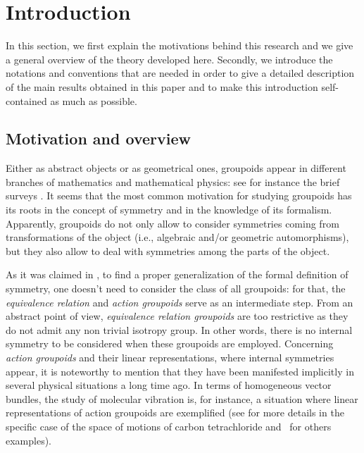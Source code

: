 \documentclass[pdftex]{sigma}
\numberwithin{equation}{section}
\begin{document}

\newcommand{\rJoin}{\rtimes}
\newcommand{\lJoin}{\ltimes}

\vspace{-2mm}

\section{Introduction}

In this section, we first explain the motivations behind this research and we give a general overview of the theory developed here. Secondly, we introduce the notations and conventions that are needed in order to give a detailed description of the main results obtained in this paper and to make this introduction self-contained as much as possible.

\subsection{Motivation and overview}\label{ssec:1} Either as abstract objects or as geometrical ones, groupoids appear in different branches of mathematics and mathematical physics: see for instance the brief surveys \cite{Brown:1987, Landsman:2005,Weinstein:1996}. It seems that the most common motivation for studying groupoids has its roots in the concept of symmetry and in the knowledge of its formalism. Apparently, groupoids do not only allow to consider symmetries coming from transformations of the object (i.e., algebraic and/or geometric automorphisms), but they also allow to deal with symmetries among the parts of the object.

As it was claimed in \cite{Guay/Hepburn:2009}, to find a proper generalization of the formal definition of symmetry, one doesn't need to consider the class of all groupoids: for that, the \emph{equivalence relation} and \emph{action groupoids} serve as an intermediate step. From an abstract point of view, \emph{equivalence relation groupoids} are too restrictive as they do not admit any non trivial isotropy group. In other words, there is no internal symmetry to be considered when these groupoids are employed. Concerning \emph{action groupoids} and their linear representations, where internal symmetries appear, it is noteworthy to mention that they have been manifested implicitly in several physical situations a long time ago. In terms of homogeneous vector bundles, the study of molecular vibration is, for instance, a situation where linear representations of action groupoids are exemplified (see \cite[Section~3.2, p.~97]{Sternberg:1994} for more details in the specific case of the space of motions of carbon tetrachloride and~\cite{Pysiak:2011} for others examples).
\end{document}
